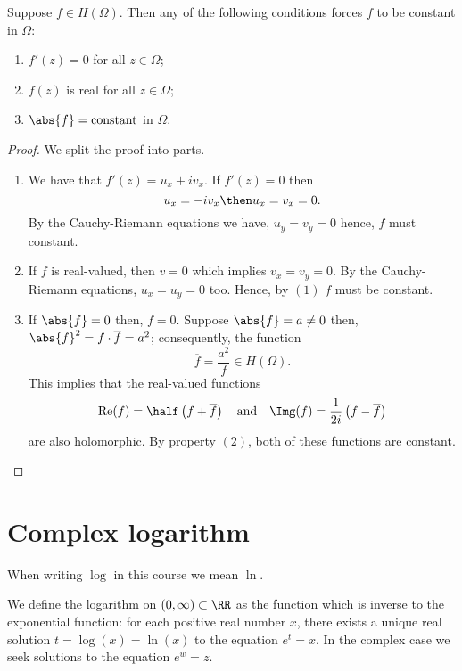 \documentclass[12pt, a4paper]{article}
\DeclareMathOperator{\R}{Re}
\begin{document}
\begin{mdprop}
    Suppose \(f \in H(\Omega)\). Then any of the following conditions forces \(f\) to be constant in \(\Omega\):
    \begin{enumerate}
        \item \(f'(z)=0\) for all \(z \in \Omega\);
        \item \(f(z)\) is real for all \(z \in \Omega\);
        \item \(\abs{f} = \text{constant}\) in \(\Omega\).
    \end{enumerate}
\end{mdprop}

\begin{proof}
    We split the proof into parts.
    \begin{enumerate}
        \item We have that \(f'(z) = u_x +iv_x\). If \(f'(z)=0\) then
        \[u_x =-iv_x \then u_x=v_x=0.\]
        By the Cauchy-Riemann equations we have, \(u_y=v_y=0\) hence, \(f\) must constant.
        \item If \(f\) is real-valued, then \(v=0\) which implies \(v_x=v_y=0\). By the Cauchy-Riemann equations, \(u_x=u_y =0\) too. Hence, by \((1)\) \(f\) must be constant.
        \item If \(\abs{f}=0\) then, \(f=0\). Suppose \(\abs{f}=a\neq 0\) then, \(\abs{f}^2= f \cdot \overline{f}=a^2\); consequently, the function 
        \[\overline{f} = \frac{a^2}{f} \in H(\Omega).\]
        This implies that the real-valued functions 
        \[\R(f) = \half \left( f+ \overline{f} \right) \quad \text{and} \quad \Img(f) = \frac{1}{2i} \left( f-\overline{f} \right)\]
        are also holomorphic. By property \((2)\), both of these functions are constant.
    \end{enumerate}
\end{proof}

\section{Complex logarithm}

\begin{mdremark}
    When writing \(\log\) in this course we mean \(\ln\).
\end{mdremark}

We define the logarithm on \((0,\infty) \subset \RR\) as the function which is inverse to the exponential function: for each positive real number \(x\), there exists a unique real solution \(t = \log(x) = \ln(x)\) to the equation \(e^t=x\). In the complex case we seek solutions to the equation \(e^w=z\). 
\end{document}
